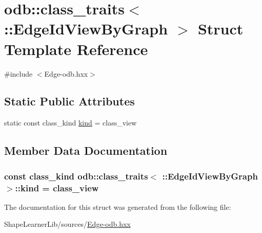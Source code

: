 \hypertarget{structodb_1_1class__traits_3_01_1_1_edge_id_view_by_graph_01_4}{}\section{odb\+:\+:class\+\_\+traits$<$ \+:\+:Edge\+Id\+View\+By\+Graph $>$ Struct Template Reference}
\label{structodb_1_1class__traits_3_01_1_1_edge_id_view_by_graph_01_4}


{\ttfamily \#include $<$Edge-\/odb.\+hxx$>$}

\subsection*{Static Public Attributes}
\begin{DoxyCompactItemize}
\item 
static const class\+\_\+kind \hyperlink{structodb_1_1class__traits_3_01_1_1_edge_id_view_by_graph_01_4_aa22f5540e417166a4ca21c7552584ff7}{kind} = class\+\_\+view
\end{DoxyCompactItemize}


\subsection{Member Data Documentation}
\hypertarget{structodb_1_1class__traits_3_01_1_1_edge_id_view_by_graph_01_4_aa22f5540e417166a4ca21c7552584ff7}{}
\subsubsection[{kind}]{\setlength{\rightskip}{0pt plus 5cm}const class\+\_\+kind odb\+::class\+\_\+traits$<$ \+::{\bf Edge\+Id\+View\+By\+Graph} $>$\+::kind = class\+\_\+view\hspace{0.3cm}{\ttfamily [static]}}\label{structodb_1_1class__traits_3_01_1_1_edge_id_view_by_graph_01_4_aa22f5540e417166a4ca21c7552584ff7}


The documentation for this struct was generated from the following file\+:\begin{DoxyCompactItemize}
\item 
Shape\+Learner\+Lib/sources/\hyperlink{_edge-odb_8hxx}{Edge-\/odb.\+hxx}\end{DoxyCompactItemize}
